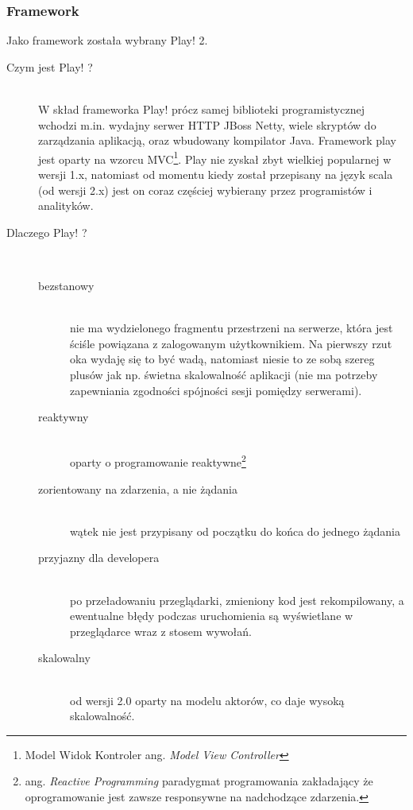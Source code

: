 \subsubsection{Framework}

Jako framework została wybrany Play! 2.

\begin{description}
	\item[Czym jest Play! ?]\hfill \\
		W skład frameworka Play! prócz samej biblioteki programistycznej wchodzi m.in. wydajny serwer HTTP JBoss Netty, wiele skryptów do zarządzania aplikacją, oraz wbudowany kompilator Java. Framework play jest oparty na wzorcu MVC\footnote{Model Widok Kontroler ang. \emph{Model View Controller}}. Play nie zyskał zbyt wielkiej popularnej w wersji 1.x, natomiast od momentu kiedy został przepisany na język scala (od wersji 2.x) jest on coraz częściej wybierany przez programistów i analityków. 
	\item[Dlaczego Play! ?]\hfill \\
		\begin{description}
			\item[bezstanowy] \hfill \\ nie ma wydzielonego fragmentu przestrzeni na serwerze, która jest ściśle powiązana z zalogowanym użytkownikiem. Na pierwszy rzut oka wydaję się to być wadą, natomiast niesie to ze sobą szereg plusów jak np. świetna skalowalność aplikacji (nie ma potrzeby zapewniania zgodności spójności sesji pomiędzy serwerami).
			\item[reaktywny] \hfill \\ oparty o programowanie reaktywne\footnote{ang. \emph{Reactive Programming} paradygmat programowania zakładający że oprogramowanie jest zawsze responsywne na nadchodzące zdarzenia.}		
			\item[zorientowany na zdarzenia, a nie żądania] \hfill \\ wątek nie jest przypisany od początku do końca do jednego żądania
			\item[przyjazny dla developera] \hfill \\ po przeładowaniu przeglądarki, zmieniony kod jest rekompilowany, a ewentualne błędy podczas uruchomienia są wyświetlane w przeglądarce wraz z stosem wywołań.
			\item[skalowalny] \hfill \\ od wersji 2.0 oparty na modelu aktorów, co daje wysoką skalowalność. 
		\end{description}
\end{description}




